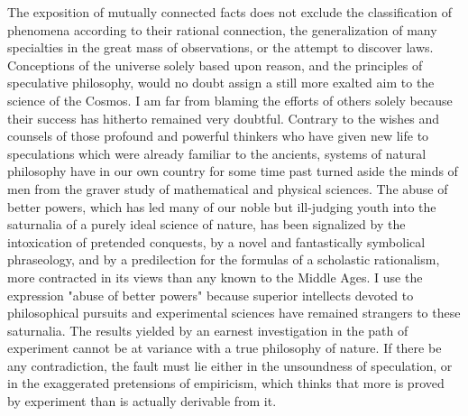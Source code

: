 The exposition of mutually connected facts does not exclude the classification of phenomena according to their rational connection, the generalization of many specialties in the great mass of observations, or the attempt to discover laws. Conceptions of the universe solely based upon reason, and the principles of speculative philosophy, would no doubt assign a still more exalted aim to the science of the Cosmos. I am far from blaming the efforts of others solely because their success has hitherto remained very doubtful. Contrary to the wishes and counsels of those profound and powerful thinkers who have given new life to speculations which were already familiar to the ancients, systems of natural philosophy have in our own country for some time past turned aside the minds of men from the graver study of mathematical and physical sciences. The abuse of better powers, which has led many of our noble but ill-judging youth into the saturnalia of a purely ideal science of nature, has been signalized by the intoxication of pretended conquests, by a novel and fantastically symbolical phraseology, and by a predilection for the formulas of a scholastic rationalism, more contracted in its views than any known to the Middle Ages. I use the expression "abuse of better powers" because superior intellects devoted to philosophical pursuits and experimental sciences have remained strangers to these saturnalia. The results yielded by an earnest investigation in the path of experiment cannot be at variance with a true philosophy of nature. If there be any contradiction, the fault must lie either in the unsoundness of speculation, or in the exaggerated pretensions of empiricism, which thinks that more is proved by experiment than is actually derivable from it.

